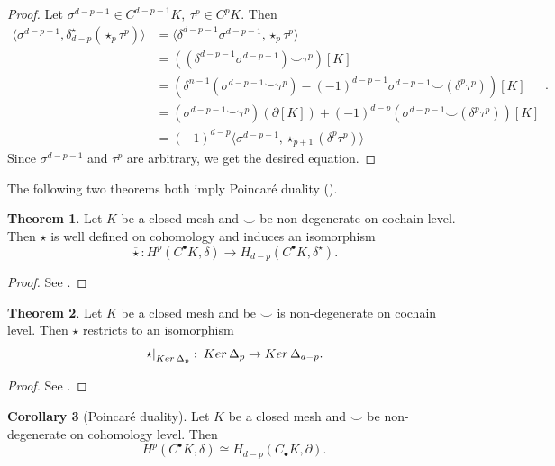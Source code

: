 \documentclass{elsarticle}
\theoremstyle{definition}
\newtheorem{theorem}{Theorem}[section]
\newtheorem{corollary}[theorem]{Corollary}
\newcommand{\inner}[2]{\langle#1,#2\rangle}
\newcommand{\Ker}{\mathop{\rm Ker}\nolimits}
\begin{document}
\begin{proof}
  Let $\sigma^{d - p - 1} \in C^{d - p - 1} K,\ \tau^p \in C^p K$. Then
  \begin{equation*}
    \begin{split}
      \inner{\sigma^{d - p - 1}}{\delta^\star_{d - p} (\star_p \tau^p)} 
        & = \inner{\delta^{d - p - 1} \sigma^{d - p - 1}}{\star_p \tau^p} \\
        & = ((\delta^{d - p - 1} \sigma^{d - p - 1}) \smile\tau^p)[K] \\
        & = (\delta^{n - 1}(\sigma^{d - p - 1} \smile \tau^p) 
          - (-1)^{d - p - 1} \sigma^{d - p - 1} \smile (\delta^p \tau^p))[K] \\
        & = (\sigma^{d - p - 1} \smile \tau^p)(\partial [K])
          + (-1)^{d - p} (\sigma^{d - p - 1} \smile (\delta^p \tau^p))[K] \\
        & = (-1)^{d - p} \inner{\sigma^{d - p - 1}}{\star_{p + 1} (\delta^p \tau^p)}
    \end{split}.
  \end{equation*}
  Since $\sigma^{d - p - 1}$ and $\tau^p$ are arbitrary, we get the desired equation.
\end{proof}
The following two theorems both imply Poincar\'e duality ().
\begin{theorem}
  Let $K$ be a closed mesh and $\smile$ be non-degenerate on cochain level. Then $\star$ is well defined on cohomology and induces an isomorphism
  \begin{equation}
    \overline{\star} \colon H^p(C^\bullet K, \delta) \to H_{d - p}(C^\bullet K, \delta^\star).
  \end{equation}
\end{theorem}
\begin{proof}
  See \cite[Theorem 3.3.6]{arnold2012discrete}.
\end{proof}
\begin{theorem}
  Let $K$ be a closed mesh and be $\smile$ is non-degenerate on cochain level. Then $\star$ restricts to an isomorphism
  \begin{equation}
    \left. \star \right|_{\Ker \Delta_p} \colon \Ker \Delta_p \to \Ker \Delta_{d - p}.
  \end{equation}
\end{theorem}
\begin{proof}
  See \cite[Lemma 6.2 (3)]{wilson2007cochain}.
\end{proof}
\begin{corollary}[Poincar\'e duality]
\label{thm:poincare_duality}
  Let $K$ be a closed mesh and $\smile$ be non-degenerate on cohomology level. Then
  \begin{equation}
    H^p(C^{\bullet} K, \delta) \cong H_{d - p}(C_{\bullet} K, \partial).
  \end{equation}
\end{corollary}
\end{document}

